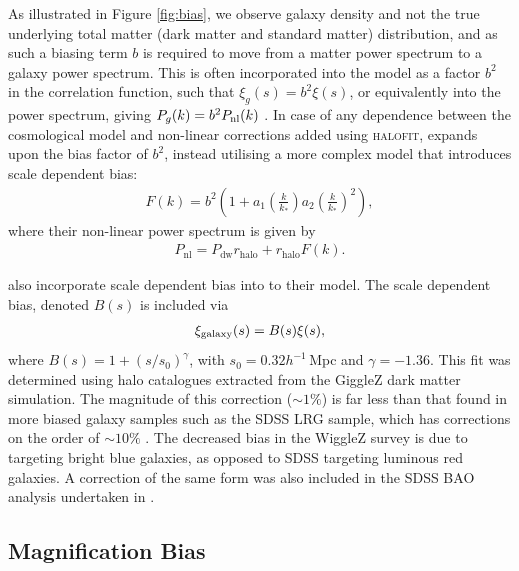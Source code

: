 \documentclass[titlesmallcaps, examinerscopy, copyrightpage]{uqthesis}
\newcommand{\halofit}{\textsc{halofit}}
\begin{document}
As illustrated in Figure \ref{fig:bias}, we observe galaxy density and not the true underlying total matter (dark matter and standard matter) distribution, and as such a biasing term $b$ is required to move from a matter power spectrum to a galaxy power spectrum. This is often incorporated into the model as a factor $b^2$ in the correlation function, such that $\xi_g(s) = b^2 \xi(s)$, or equivalently into the power spectrum, giving $P_g(k) = b^2 P_{\rm{nl}}(k)$ \citep{BlakeDavis2011, ChuangWang2012, XuPadmanabhan2012, AndersonAubourg2012, MontesanoSanchezPhelps2012}. In case of any dependence between the cosmological model and non-linear corrections added using \halofit{}, \citet{ReidPercival2010} expands upon the bias factor of $b^2$, instead utilising a more complex model that introduces scale dependent bias:
\begin{align}
F(k) = b^2\left(1 + a_1 \left(\frac{k}{k_*}\right) a_2 \left( \frac{k}{k_*} \right)^2 \right),
\end{align}
where their non-linear power spectrum is given by 
\begin{align}
P_{\text{nl}} = P_{\text{dw}} r_{\text{halo}} + r_{\text{halo}} F(k).
\end{align}

\citet{BlakeDavis2011} also incorporate scale dependent bias into to their model. The scale dependent bias, denoted $B(s)$ is included via
\begin{align}
\xi_{\rm{galaxy}}(s) = B(s) \xi(s),
\end{align}
where $B(s) = 1 + (s/s_0)^\gamma$, with $s_0 = 0.32 h^{-1}\,$Mpc and $\gamma = -1.36$. This fit was determined using halo catalogues extracted from the GiggleZ dark matter simulation. The magnitude of this correction ($\sim 1\%$) is far less than that found in more biased galaxy samples such as the SDSS LRG sample, which has corrections on the order of $\sim 10\%$ \citep{EisensteinZehavi2005}. The decreased bias in the WiggleZ survey is due to targeting bright blue galaxies, as opposed to SDSS targeting luminous red galaxies. A correction of the same form was also included in the SDSS BAO analysis undertaken in \citet{VeropalumboMarulliMoscardini2014}.









\subsection{Magnification Bias}
\end{document}
